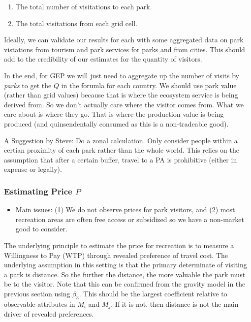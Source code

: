\documentclass[
  letterpaper,
  DIV=11,
  numbers=noendperiod]{scrartcl}
\providecommand{\tightlist}{%
  \setlength{\itemsep}{0pt}\setlength{\parskip}{0pt}}\usepackage{longtable,booktabs,array}
\begin{document}
\begin{enumerate}
\def\labelenumi{\arabic{enumi}.}
\tightlist
\item
  The total number of visitations to each park.
\item
  The total visitations from each grid cell.
\end{enumerate}

Ideally, we can validate our results for each with some aggregated data
on park vistations from tourism and park services for parks and from
cities. This should add to the credibility of our estimates for the
quantity of visitors.

In the end, for GEP we will just need to aggregate up the number of
visits by \emph{parks} to get the \(Q\) in the forumla for each country.
We should use park value (rather than grid values) because that is where
the ecosystem service is being derived from. So we don't actually care
where the visitor comes from. What we care about is where they go. That
is where the production value is being produced (and quinsendentally
consumed as this is a non-tradeable good).

A Suggestion by Steve: Do a zonal calculation. Only consider people
within a certian proximity of each park rather than the whole world.
This relies on the assumption that after a certain buffer, travel to a
PA is prohibitive (either in expense or legally).

\hypertarget{estimating-price-p-1}{%
\subsubsection{\texorpdfstring{Estimating Price
\(P\)}{Estimating Price P}}\label{estimating-price-p-1}}

\begin{itemize}
\tightlist
\item
  Main issues: (1) We do not observe prices for park visitors, and (2)
  most recreation areas are often free access or subsidized so we have a
  non-market good to consider.
\end{itemize}

The underlying principle to estimate the price for recreation is to
measure a Willingness to Pay (WTP) through revealed preference of travel
cost. The underlying assumption in this setting is that the primary
determinate of visiting a park is distance. So the further the distance,
the more valuable the park must be to the visitor. Note that this can be
confirmed from the gravity model in the previous section using
\(\beta_3\). This should be the largest coefficient relative to
observable attributes in \(M_i\) and \(M_j\). If it is not, then
distance is not the main driver of revealed preferences.
\end{document}
